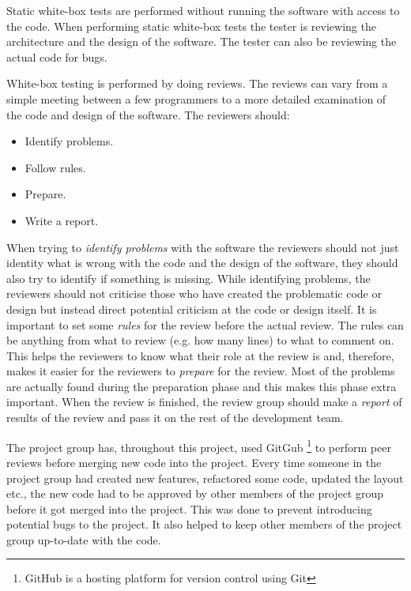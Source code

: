 Static white-box tests are performed without running the software with access to the code. %
When performing static white-box tests the tester is reviewing the architecture and the design of the software.
The tester can also be reviewing the actual code for bugs. \cite{SoftwareTesting} %

White-box testing is performed by doing reviews.
The reviews can vary from a simple meeting between a few programmers to a more detailed examination of the code and design of the software.
The reviewers should: \cite{SoftwareTesting}

\begin{itemize}
	\item Identify problems.
	\item Follow rules.
	\item Prepare.
	\item Write a report.
\end{itemize}

When trying to \textit{identify problems} with the software the reviewers should not just identity what is wrong with the code and the design of the software, they should also try to identify if something is missing.
While identifying problems, the reviewers should not criticise those who have created the problematic code or design but instead direct potential criticism at the code or design itself.
It is important to set some \textit{rules} for the review before the actual review.
The rules can be anything from what to review (e.g. how many lines) to what to comment on.
This helps the reviewers to know what their role at the review is and, therefore, makes it easier for the reviewers to \textit{prepare} for the review.
Most of the problems are actually found during the preparation phase and this makes this phase extra important.
When the review is finished, the review group should make a \textit{report} of results of the review and pass it on the rest of the development team. \cite{SoftwareTesting}

The project group has, throughout this project, used GitGub \footnote{GitHub is a hosting platform for version control using Git} to perform peer reviews before merging new code into the project. %
Every time someone in the project group had created new features, refactored some code, updated the layout etc., the new code had to be approved by other members of the project group before it got merged into the project.
This was done to prevent introducing potential bugs to the project.
It also helped to keep other members of the project group up-to-date with the code.

